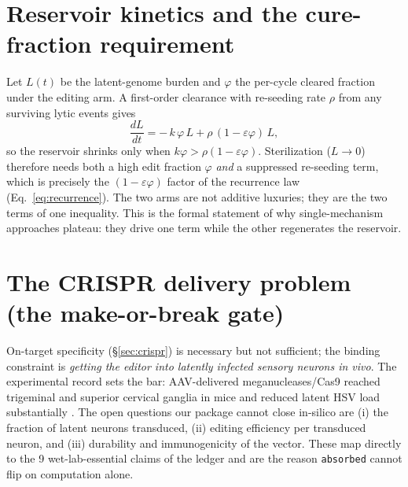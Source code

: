 \documentclass[11pt,a4paper]{article}
\begin{document}
\section{Reservoir kinetics and the cure-fraction requirement}
\label{sec:reservoir}
Let $L(t)$ be the latent-genome burden and $\varphi$ the per-cycle cleared
fraction under the editing arm. A first-order clearance with re-seeding rate
$\rho$ from any surviving lytic events gives
\begin{equation}
\frac{dL}{dt} = -\,k\,\varphi\,L + \rho\,(1-\varepsilon\varphi)\,L,
\label{eq:reservoir}
\end{equation}
so the reservoir shrinks only when $k\varphi > \rho(1-\varepsilon\varphi)$.
Sterilization ($L\to 0$) therefore needs both a high edit fraction $\varphi$
\emph{and} a suppressed re-seeding term, which is precisely the
$(1-\varepsilon\varphi)$ factor of the recurrence law
(Eq.~\ref{eq:recurrence}). The two arms are not additive luxuries; they are the
two terms of one inequality. This is the formal statement of why
single-mechanism approaches plateau: they drive one term while the other
regenerates the reservoir.

\section{The CRISPR delivery problem (the make-or-break gate)}
\label{sec:delivery}
On-target specificity (\S\ref{sec:crispr}) is necessary but not sufficient; the
binding constraint is \emph{getting the editor into latently infected sensory
neurons in vivo}. The experimental record sets the bar: AAV-delivered
meganucleases/Cas9 reached trigeminal and superior cervical ganglia in mice and
reduced latent HSV load substantially \citep{aubert2020,jerome2022}. The open
questions our package cannot close in-silico are (i) the fraction of latent
neurons transduced, (ii) editing efficiency per transduced neuron, and (iii)
durability and immunogenicity of the vector. These map directly to the 9
wet-lab-essential claims of the ledger and are the reason \texttt{absorbed}
cannot flip on computation alone.
\end{document}
